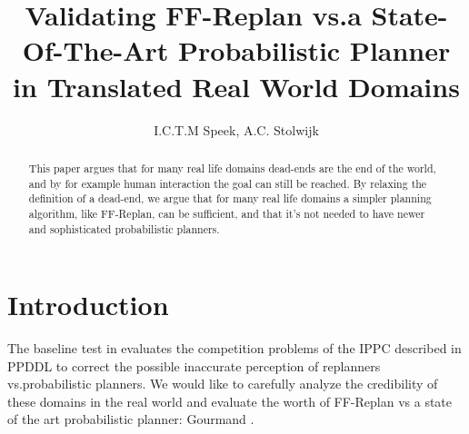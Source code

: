 \documentclass[runningheads,a4paper]{llncs}
\begin{document}
\mainmatter%

\title{Validating FF-Replan vs.\@ a State-Of-The-Art Probabilistic Planner in Translated Real World Domains}


\author{I.C.T.M Speek, A.C. Stolwijk}

%



\maketitle


\begin{abstract}
	This paper argues that for many real life domains dead-ends are the end of
	the world, and by for example human interaction the goal can still be
	reached. By relaxing the definition of a dead-end, we argue that for many
	real life domains a simpler planning algorithm, like FF-Replan, can be
	sufficient, and that it's not needed to have newer and sophisticated
	probabilistic planners.
\end{abstract}


\section{Introduction}

The baseline test in \cite{little2007probvsreplan} evaluates the competition problems of the IPPC described in PPDDL to correct the possible inaccurate perception of replanners vs.\@ probabilistic planners. We would like to carefully analyze the credibility of these domains in the real world and evaluate the worth of FF-Replan vs a state of the art probabilistic planner: Gourmand \cite{kolobov2012gourmand}.
\end{document}
